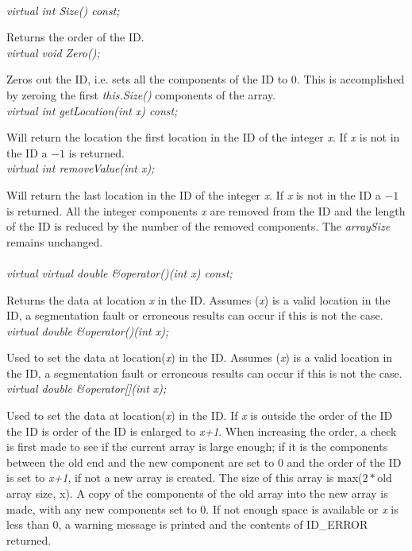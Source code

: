   \\
{\em virtual int Size() const;} 

Returns the order of the ID. \\

{\em virtual void Zero();} 

Zeros out the ID, i.e. sets all the components of the ID to
$0$. This is accomplished by zeroing the first {\em this.Size()}
components of the array. \\

{\em virtual int getLocation(int x) const;} 

Will return the location the first location in the ID of the integer
{\em x}. If {\em x} is not in the ID a $-1$ is returned. \\

{\em virtual int removeValue(int x);} 

Will return the last location in the ID of the integer
{\em x}. If {\em x} is not in the ID a $-1$ is returned. All the integer
components {\em x} are removed from the ID and the length of the ID is
reduced by the number of the removed components. The {\em arraySize}
remains unchanged. \\ 


  \\
{\em virtual virtual double \&operator()(int x) const;} 

Returns the data at location {\em x} in the ID. Assumes ({\em x})
is a valid location in the ID, a segmentation fault or erroneous
results can occur if this is not the case. \\

{\em virtual double \&operator()(int x);} 

Used to set the data at location({\em x}) in the ID. Assumes ({\em x})
is a valid location in the ID, a segmentation fault or erroneous
results can occur if this is not the case. \\

{\em virtual double \&operator[](int x);} 

Used to set the data at location({\em x}) in the ID. If {\em x} is outside
the order of the ID the ID is order of the ID is enlarged to {\em
x+1}. When increasing the order, a check is first made to see if the
current array is large enough; if it is the components between the old
end and the new component are set to $0$ and the order of the ID is set
to {\em x+1}, if not a new array is created. The size of this array is
max($2*$old array size, x). A copy of the components of the old array
into the new array is made, with any new components set to $0$. If not
enough space is available or {\em x} is less than $0$, a warning
message is printed and the contents of ID\_ERROR returned. \\


